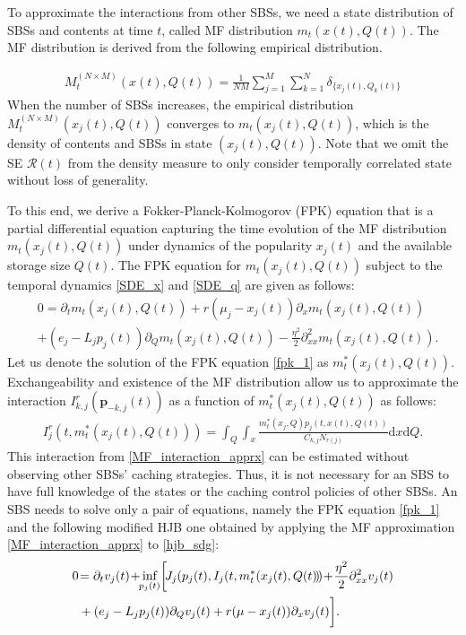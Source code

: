 \documentclass{book}
\begin{document}
    To approximate the interactions from other SBSs, we need a state distribution of SBSs and contents at time $t$, called MF distribution $m_t(x(t),Q(t))$.
    The MF distribution is derived from the following empirical distribution.
    
    \begin{align}
     M_t^{(N\times M)}(x(t),Q(t))= \frac{1}{NM}\sum_{j=1}^{M}\sum_{k=1}^{N} \delta_{\{x_j(t),Q_k(t)\}}
    \end{align}
    When the number of SBSs increases, the empirical distribution $M_t^{(N \times M)}(x_j(t),Q(t))$ converges to $m_t(x_j(t),Q(t))$, which is the density of contents and SBSs in state $(x_j(t),Q(t))$. Note that we omit the SE $\mathcal{R}(t)$ from the density measure to only consider temporally correlated state without loss of generality.
    
    To this end, we derive a Fokker-Planck-Kolmogorov (FPK) equation \cite{MFG_application} that is a partial differential equation capturing the time evolution of the MF distribution $m_t(x_j(t),Q(t))$ under dynamics of the popularity $x_j(t)$ and the available storage size $Q(t)$. 
    The FPK equation for $m_t(x_j(t),Q(t))$ subject to the temporal dynamics  \eqref{SDE_x} and  \eqref{SDE_q} are given as follows:
    \begin{align}
    &0= \partial_t m_t(x_j(t),Q(t)) +r(\mu_j-x_j(t))\partial_x m_t(x_j(t),Q(t)) \nonumber \\&+ (e_j\!-\!L_j p_{j}(t)) \partial_{Q}m_t(x_j(t),Q(t)) 
     \!- \!\frac{\eta^2}{2}\partial_{xx}^2 m_t(x_j(t),Q(t)).  \label{fpk_1}
    \end{align}
    \noindent Let us denote the solution of the FPK equation \eqref{fpk_1} as $m_t^*(x_j(t),Q(t))$. 
    Exchangeability and existence of the MF distribution allow us to approximate the interaction $I^r_{k,j}(\boldsymbol{p}_{-k,j}(t))$ as a function of $m_t^*(x_j(t),Q(t))$ as follows:
    \begin{align}
    I^r_{j}(t,m_t^*(x_j(t),Q(t)\!)\!)\!=\!\!\int_{\!Q}\!\int_{\!x} \frac{m_t^*(x_j,Q){p}_{j}(t,\!x(t),\!Q(t))}{C_{k,j}N_{r(j)}} \text{d}x\text{d}Q. \label{MF_interaction_apprx}
    \end{align}
    {\noindent This interaction from \eqref{MF_interaction_apprx} can be estimated without observing other SBSs' caching strategies.
    Thus, it is not necessary for an SBS to have full knowledge of the states or the caching control policies of other SBSs. An SBS needs to solve only a pair of equations, namely the FPK equation \eqref{fpk_1} and the following modified HJB one obtained by applying the MF approximation \eqref{MF_interaction_apprx} to \eqref{hjb_sdg}: } 
    \begin{align}
    0&\!= \partial_t v_{j}(t)\! +\!\!\mathop{\text{inf}}\limits_{p_{j}(t)} \!\bigg{[}\!J_{j}(p_{j}(t),I_j(t,m_t^*(x_j(t),Q(t)\!)\!)\!+\! \frac{\eta^2}{2}\partial_{\small{xx}}^2 v_{j}(t)\nonumber \\
     &+ (e_j -L_j p_{j}(t)) \partial_{Q}v_{j}(t)+r(\mu-x_j(t))\partial_x v_{j}(t)\bigg{]}. \label{hjb_mfg}
    \end{align}
    
\end{document}
